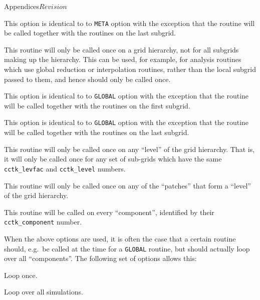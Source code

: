 \begin{cactuspart}{Appendices}{}{$Revision$}
\begin{Lentry}
\item[{\tt META-LATE}] This option is identical to to {\tt META}
  option with the exception that the routine will be called together
  with the routines on the last subgrid.
  
\item[{\tt GLOBAL}] This routine will only be called once on a grid
  hierarchy, not for all subgrids making up the hierarchy.  This can
  be used, for example, for analysis routines which use global
  reduction or interpolation routines, rather than the local subgrid
  passed to them, and hence should only be called once.
  
\item[{\tt GLOBAL-EARLY}] This option is identical to to {\tt GLOBAL}
  option with the exception that the routine will be called together
  with the routines on the first subgrid.
  
\item[{\tt GLOBAL-LATE}] This option is identical to to {\tt GLOBAL}
  option with the exception that the routine will be called together
  with the routines on the last subgrid.
  
\item[{\tt LEVEL}] This routine will only be called once on any
  ``level'' of the grid hierarchy.  That is, it will only be called
  once for any set of sub-grids which have the same
  \texttt{cctk\_levfac} and \texttt{cctk\_level} numbers.
  
\item[{\tt SINGLEMAP}] This routine will only be called once on any of
  the ``patches'' that form a ``level'' of the grid hierarchy.
  
\item[{\tt LOCAL} (this is the default)] This routine will be called
  on every ``component'', identified by their \texttt{cctk\_component}
  number.

\end{Lentry}

When the above options are used, it is often the case that a certain
routine should, e.g.\ be called at the time for a \texttt{GLOBAL}
routine, but should actually loop over all ``components''.  The
following set of options allows this:

\begin{Lentry}
  
\item[{\tt LOOP-META}] Loop once.
  
\item[{\tt LOOP-GLOBAL}] Loop over all simulations.
  

\end{Lentry}
\end{cactuspart}
